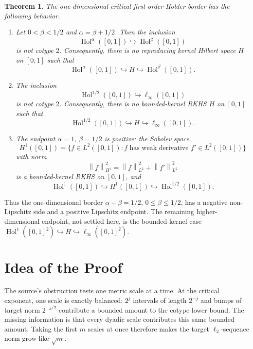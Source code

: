 \documentclass[11pt]{article}
\newtheorem{theorem}{Theorem}
\newcommand{\Hol}{\operatorname{Hol}}
\newcommand{\linf}{\ell_\infty}
\newcommand{\norm}[1]{\left\lVert #1\right\rVert}
\begin{document}
\begin{theorem}\label{thm:border}
The one-dimensional critical first-order Holder border has the following
behavior.

\begin{enumerate}
\item Let \(0<\beta<1/2\) and \(\alpha=\beta+1/2\). Then the inclusion
\[
  \Hol^\alpha([0,1])\hookrightarrow \Hol^\beta([0,1])
\]
is not cotype \(2\). Consequently, there is no reproducing kernel Hilbert
space \(H\) on \([0,1]\) such that
\[
  \Hol^\alpha([0,1])\hookrightarrow H\hookrightarrow
  \Hol^\beta([0,1]).
\]

\item The inclusion
\[
  \Hol^{1/2}([0,1])\hookrightarrow \linf([0,1])
\]
is not cotype \(2\). Consequently, there is no bounded-kernel RKHS \(H\) on
\([0,1]\) such that
\[
  \Hol^{1/2}([0,1])\hookrightarrow H\hookrightarrow \linf([0,1]).
\]

\item The endpoint \(\alpha=1\), \(\beta=1/2\) is positive: the Sobolev space
\[
  H^1([0,1])=\{f\in L^2([0,1]): f \text{ has weak derivative }
  f'\in L^2([0,1])\}
\]
with norm
\[
  \norm{f}_{H^1}^2=\norm{f}_{L^2}^2+\norm{f'}_{L^2}^2
\]
is a bounded-kernel RKHS on \([0,1]\), and
\[
  \Hol^1([0,1])\hookrightarrow H^1([0,1])
  \hookrightarrow \Hol^{1/2}([0,1]).
\]
\end{enumerate}
\end{theorem}

Thus the one-dimensional border \(\alpha-\beta=1/2\), \(0\leq\beta\leq1/2\),
has a negative non-Lipschitz side and a positive Lipschitz endpoint. The
remaining higher-dimensional endpoint, not settled here, is the bounded-kernel
case \(\Hol^1([0,1]^2)\hookrightarrow H\hookrightarrow\linf([0,1]^2)\).

\section*{Idea of the Proof}

The source's obstruction tests one metric scale at a time. At the critical
exponent, one scale is exactly balanced: \(2^j\) intervals of length \(2^{-j}\)
and bumps of target norm \(2^{-j/2}\) contribute a bounded amount to the
cotype lower bound. The missing information is that every dyadic scale
contributes this same bounded amount. Taking the first \(m\) scales at once
therefore makes the target \(\ell_2\)-sequence norm grow like \(\sqrt m\).
\end{document}
